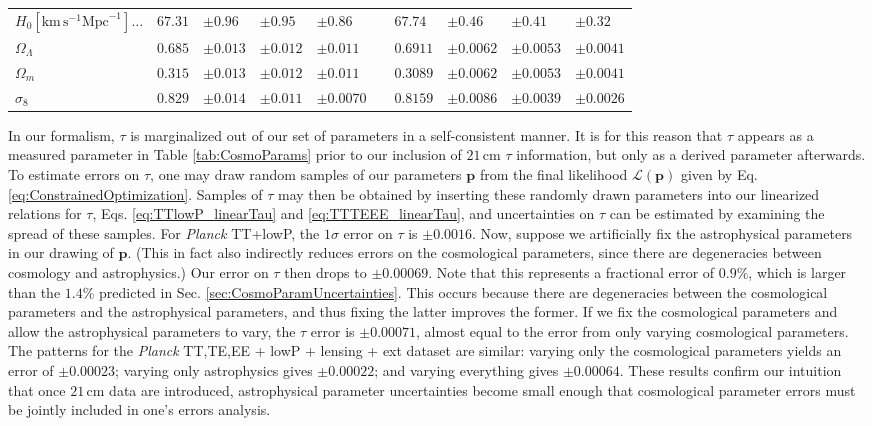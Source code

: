 \documentclass[twocolumn,aps,prd,nofootinbib,showpacs]{revtex4-1}
\begin{document}
\begin{table}
\begin{ruledtabular}
\begin{tabular}{lllllcllll}
$H_0 \left[ \textrm{km}\,\textrm{s}^{-1}\textrm{Mpc}^{-1}\right] \dots$ \dotfill & $67.31 $&$\pm 0.96$ & $\pm0.95$ &  $\pm 0.86$ && $67.74 $&$\pm 0.46$ & $\pm 0.41$ &  $\pm 0.32$ \\
$\Omega_\Lambda$ \dotfill & $0.685 $&$\pm 0.013$ &  $ \pm 0.012$ &  $\pm 0.011$ && $0.6911$& $ \pm 0.0062$ & $\pm 0.0053$ &  $\pm 0.0041$ \\
$\Omega_m$ \dotfill & $0.315$& $ \pm 0.013$ &   $ \pm 0.012$ & $\pm 0.011$&& $0.3089 $&$\pm 0.0062$ &   $\pm 0.0053$  &$\pm 0.0041$ \\
$\sigma_8$ \dotfill & $0.829$&$ \pm 0.014$ & $\pm 0.011$  & $\mathbf{\pm 0.0070}$ && $0.8159$& $ \pm 0.0086$ & $\mathbf{\pm 0.0039}$ &  $\mathbf{\pm 0.0026}$\\
\end{tabular}
\end{ruledtabular}
\end{table}

In our formalism, $\tau$ is marginalized out of our set of parameters in a self-consistent manner. It is for this reason that $\tau$ appears as a measured parameter in Table \ref{tab:CosmoParams} prior to our inclusion of $21\,\textrm{cm}$ $\tau$ information, but only as a derived parameter afterwards. To estimate errors on $\tau$, one may draw random samples of our parameters $\mathbf{p}$ from the final likelihood $\mathcal L (\mathbf{p})$ given by Eq. \eqref{eq:ConstrainedOptimization}. Samples of $\tau$ may then be obtained by inserting these randomly drawn parameters into our linearized relations for $\tau$, Eqs. \eqref{eq:TTlowP_linearTau} and \eqref{eq:TTTEEE_linearTau}, and uncertainties on $\tau$ can be estimated by examining the spread of these samples. For \emph{Planck} TT+lowP, the $1\sigma$ error on $\tau$ is $\pm 0.0016$. Now, suppose we artificially fix the astrophysical parameters in our drawing of $\mathbf{p}$. (This in fact also indirectly reduces errors on the cosmological parameters, since there are degeneracies between cosmology and astrophysics.) Our error on $\tau$ then drops to $\pm 0.00069$. Note that this represents a fractional error of $0.9\%$, which is larger than the $1.4\%$ predicted in Sec. \ref{sec:CosmoParamUncertainties}. This occurs because there are degeneracies between the cosmological parameters and the astrophysical parameters, and thus fixing the latter improves the former. If we fix the cosmological parameters and allow the astrophysical parameters to vary, the $\tau$ error is $\pm 0.00071$, almost equal to the error from only varying cosmological parameters. The patterns for the \emph{Planck} TT,TE,EE + lowP + lensing + ext dataset are similar: varying only the cosmological parameters yields an error of $\pm 0.00023$; varying only astrophysics gives $\pm 0.00022$; and varying everything gives $\pm 0.00064$. These results confirm our intuition that once $21\,\textrm{cm}$ data are introduced, astrophysical parameter uncertainties become small enough that cosmological parameter errors must be jointly included in one's errors analysis.
\end{document}
